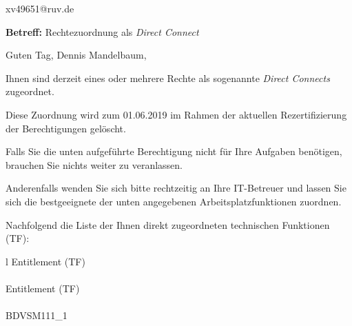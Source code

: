 \documentclass[a4paper,landscape,12pt]{letter}
\begin{document}
\begin{letter}{xv49651@ruv.de\hfill \break}
\begin{normalsize}
	\opening{\textbf{Betreff:} Rechtezuordnung als \emph{Direct Connect}}
	\begin{normalsize} \hfill
	\end{normalsize}

	\begin{normalsize}
		Guten Tag, 
	Dennis Mandelbaum, \hfill \break
	\end{normalsize}
	\end{normalsize}
	
\begin{normalsize}
	Ihnen sind derzeit eines oder mehrere Rechte als sogenannte \emph{Direct Connects} zugeordnet.
	
	Diese Zuordnung wird zum 01.06.2019 im Rahmen der aktuellen Rezertifizierung der Berechtigungen gelöscht.
	
	Falls Sie die unten aufgeführte Berechtigung nicht für Ihre Aufgaben benötigen, 
	brauchen Sie nichts weiter zu veranlassen.
	
	Anderenfalls wenden Sie sich bitte rechtzeitig an Ihre IT-Betreuer 
	und lassen Sie sich die bestgeeignete der unten angegebenen Arbeitsplatzfunktionen zuordnen.
	\end{normalsize}
	
\begin{normalsize}
	Nachfolgend die Liste der Ihnen direkt zugeordneten technischen Funktionen (TF):

	\begin{longtable}{l}
		Entitlement (TF) \\ \hline
		\endfirsthead
		\\\hline
		Entitlement (TF) \\ \hline
		\endhead %
		\multicolumn{1}{r@{}}{Fortsetzung \ldots}\\
		\endfoot
		\hline
		\endlastfoot
	BDVSM111\_1\\
	\end{longtable}
	\end{normalsize}
	

\end{letter}
\end{document}
